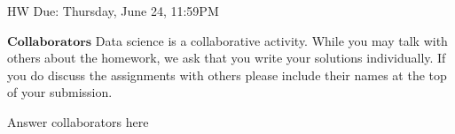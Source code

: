 \documentclass[11pt]{article}
\begin{document}
\maketitle
\fontsize{12}{15}\selectfont

\begin{center}
    HW Due: Thursday, June 24, 11:59PM
\end{center}
    
    $\textbf{Collaborators}$
    Data science is a collaborative activity. While you may talk with others about the homework, we ask that you write your solutions individually. If you do discuss the assignments with others please include their names at the top of your submission.
        \begin{Answer}
            Answer collaborators here
        \end{Answer}
        
\end{document}
